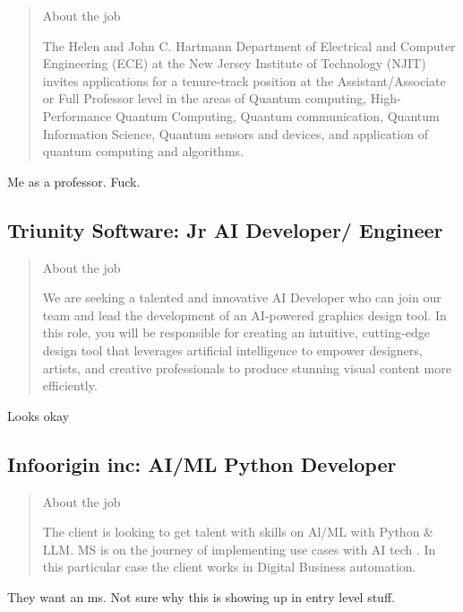 \documentclass[
	letterpaper, %
	12pt, %
]{CSSullivanBusinessReport}
\begin{document}
\begin{quote}
	About the job
	
	The Helen and John C. Hartmann Department of Electrical and Computer Engineering (ECE) at the New Jersey Institute of Technology (NJIT) invites applications for a tenure-track position at the Assistant/Associate or Full Professor level in the areas of Quantum computing, High-Performance Quantum Computing, Quantum communication, Quantum Information Science, Quantum sensors and devices, and application of quantum computing and algorithms. 

\end{quote}

Me as a professor. Fuck.


\subsection[Triunity Software]{Triunity Software: Jr AI Developer/ Engineer}

\begin{quote}
	About the job
	
	We are seeking a talented and innovative AI Developer who can join our team and lead the development of an AI-powered graphics design tool. In this role, you will be responsible for creating an intuitive, cutting-edge design tool that leverages artificial intelligence to empower designers, artists, and creative professionals to produce stunning visual content more efficiently. 

\end{quote}

Looks okay


\subsection[Infoorigin inc]{Infoorigin inc: AI/ML Python Developer}

\begin{quote}
	About the job
	
    The client is looking to get talent with skills on Al/ML with Python \& LLM. MS is on the journey of implementing use cases with AI tech .
    In this particular case the client works in Digital Business automation.

\end{quote}

They want an ms. Not sure why this is showing up in entry level stuff.
\end{document}
